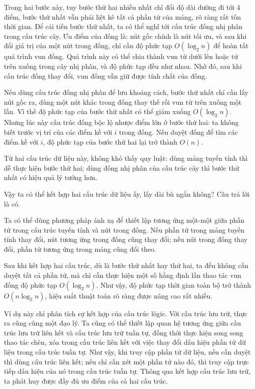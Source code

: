 \documentclass[11pt]{article}
\begin{document}
Trong hai bước này, tuy bước thứ hai nhiều nhất chỉ đổi độ dài đường đi tới
\(4\) điểm, bước thứ nhất vẫn phải liệt kê tất cả phần tử của mảng, rõ ràng
rất tốn thời gian. Để cải tiến bước thứ nhất, ta có thể nghĩ tới cấu trúc
đống nhị phân trong cấu trúc cây. Ưu điểm của đống là: nút gốc chính là nút
tối ưu, và sau khi đổi giá trị của một nút trong đống, chỉ cần độ phức tạp
\(O(\log_2 n)\) để hoàn tất quá trình vun đống. Quá trình này có thể chia
thành vun từ dưới lên hoặc từ trên xuống trong cây nhị phân, và độ phức tạp
đều như nhau. Nhờ đó, sau khi cấu trúc đống thay đổi, vun đống vẫn giữ được
tính chất của đống.

Nếu dùng cấu trúc đống nhị phân để lưu khoảng cách, bước thứ nhất chỉ cần lấy
nút gốc ra, dùng một nút khác trong đống thay thế rồi vun từ trên xuống một
lần. Vì thế độ phức tạp của bước thứ nhất có thể giảm xuống \(O(\log_2 n)\).
Nhưng lúc này cấu trúc đống bộc lộ nhược điểm lớn ở bước thứ hai: ta không
biết trước vị trí của các điểm kề với \(i\) trong đống. Nếu duyệt đống để tìm
các điểm kề với \(i\), độ phức tạp của bước thứ hai lại trở thành \(O(n)\).

Từ hai cấu trúc dữ liệu này, không khó thấy quy luật: dùng mảng tuyến tính
thì dễ thực hiện bước thứ hai; dùng đống nhị phân của cấu trúc cây thì bước
thứ nhất có hiệu quả lý tưởng hơn.

Vậy ta có thể kết hợp hai cấu trúc dữ liệu ấy, lấy dài bù ngắn không? Câu trả
lời là có.

Ta có thể dùng phương pháp ánh xạ để thiết lập tương ứng một-một giữa phần tử
trong cấu trúc tuyến tính và nút trong đống. Nếu phần tử trong mảng tuyến
tính thay đổi, nút tương ứng trong đống cũng thay đổi; nếu nút trong đống
thay đổi, phần tử tương ứng trong mảng cũng đổi theo.

Sau khi kết hợp hai cấu trúc, dù là bước thứ nhất hay thứ hai, ta đều không
cần duyệt tất cả phần tử, mà chỉ cần thực hiện một số hằng định lần thao tác
vun đống độ phức tạp \(O(\log_2 n)\). Như vậy, độ phức tạp thời gian toàn bộ
trở thành \(O(n\log_2 n)\), hiệu suất thuật toán rõ ràng được nâng cao rất
nhiều.

Ví dụ này chỉ phân tích sự kết hợp của cấu trúc lôgic. Với cấu trúc lưu trữ,
thực ra cũng cùng một đạo lý. Ta cũng có thể thiết lập quan hệ tương ứng giữa
cấu trúc lưu trữ liên kết và cấu trúc lưu trữ tuần tự, đồng thời thực hiện
song song thao tác chèn, xóa trong cấu trúc liên kết với việc thay đổi dấu
hiệu phần tử dữ liệu trong cấu trúc tuần tự. Như vậy, khi truy cập phần tử dữ
liệu, nếu cần duyệt thì dùng cấu trúc liên kết; nếu chỉ cần xét một phần tử
nào đó, thì truy cập trực tiếp dấu hiệu của nó trong cấu trúc tuần tự. Thông
qua kết hợp cấu trúc lưu trữ, ta phát huy được đầy đủ ưu điểm của cả hai cấu
trúc.
\end{document}
